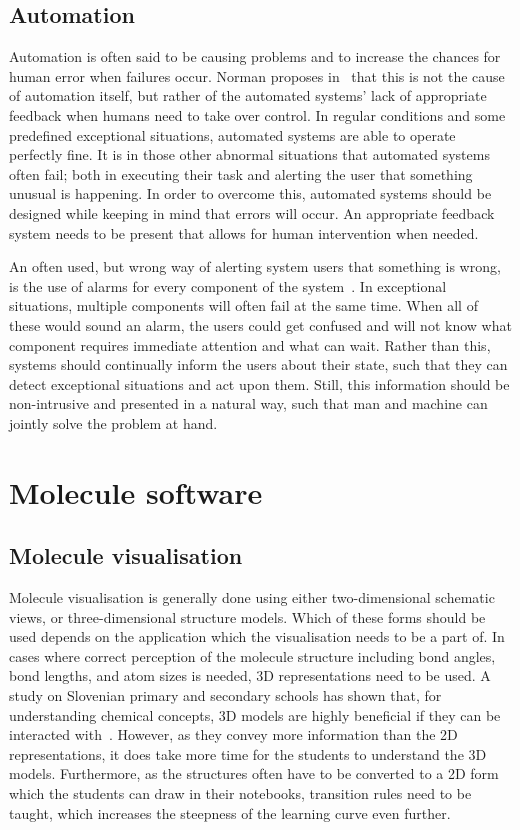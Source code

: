 \subsection{Automation}
Automation is often said to be causing problems and to increase the chances for human error when failures occur. Norman proposes in~\cite{norman1990problem} that this is not the cause of automation itself, but rather of the automated systems' lack of appropriate feedback when humans need to take over control. In regular conditions and some predefined exceptional situations, automated systems are able to operate perfectly fine. It is in those other abnormal situations that automated systems often fail; both in executing their task and alerting the user that something unusual is happening. In order to overcome this, automated systems should be designed while keeping in mind that errors will occur. An appropriate feedback system needs to be present that allows for human intervention when needed.

An often used, but wrong way of alerting system users that something is wrong, is the use of alarms for every component of the system~\cite{norman1990problem}. In exceptional situations, multiple components will often fail at the same time. When all of these would sound an alarm, the users could get confused and will not know what component requires immediate attention and what can wait. Rather than this, systems should continually inform the users about their state, such that they can detect exceptional situations and act upon them. Still, this information should be non-intrusive and presented in a natural way, such that man and machine can jointly solve the problem at hand.



\section{Molecule software}


\subsection{Molecule visualisation}
Molecule visualisation is generally done using either two-dimensional schematic views, or three-dimensional structure models. Which of these forms should be used depends on the application which the visualisation needs to be a part of. In cases where correct perception of the molecule structure including bond angles, bond lengths, and atom sizes is needed, 3D representations need to be used. A study on Slovenian primary and secondary schools has shown that, for understanding chemical concepts, 3D models are highly beneficial if they can be interacted with~\cite{ferk2003students}. However, as they convey more information than the 2D representations, it does take more time for the students to understand the 3D models. Furthermore, as the structures often have to be converted to a 2D form which the students can draw in their notebooks, transition rules need to be taught, which increases the steepness of the learning curve even further.

